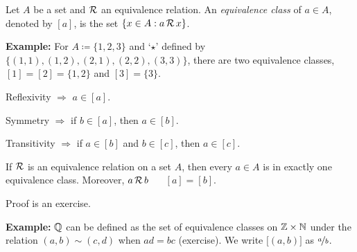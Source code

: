\documentclass[10pt,aspectratio=169]{beamer}
\begin{document}
\begin{frame}

\begin{definition}
Let $A$ be a set and ${\mathcal{R}}$ an equivalence relation.
An \emph{equivalence class} of $a \in A$, denoted
by $[a]$, is the set $\{ x \in A : a\, {\mathcal{R}} \, x \}$.
\end{definition}

\pause
\textbf{Example:}
For $A \coloneqq \{ 1,2,3 \}$ and
`$\star$' defined by
$\bigl\{ (1,1), (1,2), (2,1), (2,2), (3,3) \bigr\}$,
there are two equivalence classes,
$[1] = [2] = \{ 1,2 \}$ and $[3] = \{ 3 \}$.

\medskip
\pause

Reflexivity $\Rightarrow$ $a \in [a]$.

\pause
Symmetry $\Rightarrow$ if $b \in [a]$, then $a \in [b]$.

\pause
Transitivity $\Rightarrow$
if $a \in [b]$ and $b \in [c]$, then $a \in [c]$.

\pause

\begin{proposition}
If ${\mathcal{R}}$ is an equivalence relation on a set $A$,
then every $a \in A$ is in exactly one
equivalence class.  Moreover, $a\, {\mathcal{R}} \, b$ ~\iffif~ $[a] = [b]$.
\end{proposition}

\pause
Proof is an exercise.

\pause
\medskip

\textbf{Example:}
${\mathbb{Q}}$ can be defined as the set of equivalence classes on
${\mathbb{Z}} \times {\mathbb{N}}$ under the relation
$(a,b) \sim (c,d)$ when $ad = bc$ (exercise).
\pause
We write
$\bigl[(a,b)\bigr]$ as $\nicefrac{a}{b}$.

\end{frame}
\end{document}
